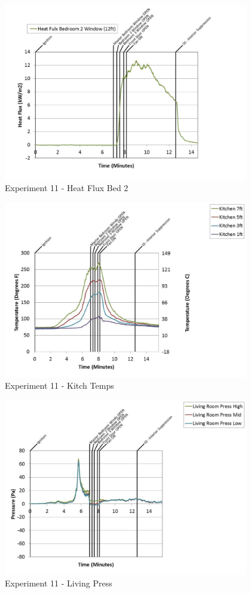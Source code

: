 \documentclass{article}
\begin{document}
\begin{appendices}
	\clearpage

	\begin{figure}[h!]
		\centering
		\includegraphics[height=3.05in]{0_Images/Results_Charts/Exp_11_Charts/HeatFluxBed2.pdf}
		\caption{Experiment 11 - Heat Flux Bed 2}
	\end{figure}
 

	\begin{figure}[h!]
		\centering
		\includegraphics[height=3.05in]{0_Images/Results_Charts/Exp_11_Charts/KitchTemps.pdf}
		\caption{Experiment 11 - Kitch Temps}
	\end{figure}
 
	\clearpage

	\begin{figure}[h!]
		\centering
		\includegraphics[height=3.05in]{0_Images/Results_Charts/Exp_11_Charts/LivingPress.pdf}
		\caption{Experiment 11 - Living Press}
	\end{figure}
 


\end{appendices}
\end{document}
